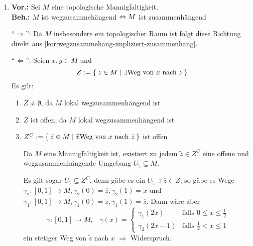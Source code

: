\begin{solution}[\ref{ub4:aufg1}]
    \begin{enumerate}[label=(\alph*)]
        \item \textbf{Vor.:} Sei $M$ eine topologische Mannigfaltigkeit.\\
              \textbf{Beh.:} $M$ ist wegzusammehängend $\Leftrightarrow M$ ist zusammenhängend
              \begin{beweis}
                \enquote{$\Rightarrow$}: Da $M$ insbesondere ein
                topologischer Raum ist folgt diese Richtung direkt 
                aus \cref{kor:wegzusammehang-impliziert-zusammenhang}.

                \enquote{$\Leftarrow$}: Seien $x,y \in M$ und
                \[Z := \Set{z \in M | \exists \text{Weg von } x \text{ nach } z}\]
                Es gilt:
                \begin{enumerate}[label=(\roman*)]
                    \item $Z \neq \emptyset$, da $M$ lokal wegzusammenhängend ist
                    \item $Z$ ist offen, da $M$ lokal wegzusammenhängend ist
                    \item $Z^C := \Set{\tilde{z} \in M | \nexists \text{Weg von } x \text{ nach } \tilde{z}}$ ist offen

                    Da $M$ eine Mannigfaltigkeit ist, existiert zu jedem
                    $\tilde{z} \in Z^C$ eine offene und wegzusammenhängende Umgebung 
                    $U_{\tilde{z}} \subseteq M$.

                    Es gilt sogar $U_{\tilde{z}} \subseteq Z^C$, denn
                    gäbe es ein $U_{\tilde{z}} \ni \overline{z} \in Z$,
                    so gäbe es Wege $\gamma_2:[0,1] \rightarrow M, \gamma_2(0) = \overline{z}, \gamma_2(1) = x$
                    und $\gamma_1:[0,1] \rightarrow M, \gamma_1(0) = \tilde{z}, \gamma_1(1) = \overline{z}$.
                    Dann wäre aber
                    \[\gamma:[0,1] \rightarrow M,\;\;\; \gamma(x) = \begin{cases}
                        \gamma_1(2x)   &\text{falls } 0 \leq x \leq \frac{1}{2}\\
                        \gamma_2(2x-1) &\text{falls } \frac{1}{2} < x \leq 1
                        \end{cases}\]
                    ein stetiger Weg von $\tilde{z}$ nach $x$
                    $\Rightarrow$ Widerspruch.


\end{enumerate}
\end{beweis}
\end{enumerate}
\end{solution}
